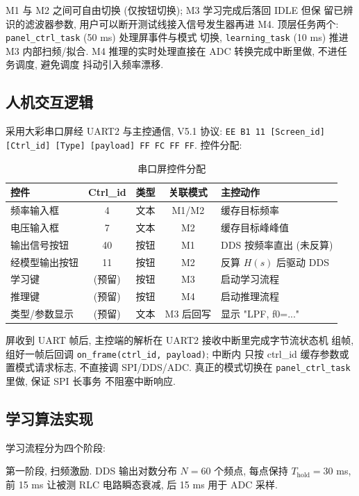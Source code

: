 \documentclass[a4paper]{article}
\begin{document}
M1 与 M2 之间可自由切换 (仅按钮切换); M3 学习完成后落回 IDLE 但保
留已辨识的滤波器参数, 用户可以断开测试线接入信号发生器再进 M4.
顶层任务两个: \texttt{panel\_ctrl\_task} (50 ms) 处理屏事件与模式
切换, \texttt{learning\_task} (10 ms) 推进 M3 内部扫频/拟合. M4
推理的实时处理直接在 ADC 转换完成中断里做, 不进任务调度, 避免调度
抖动引入频率漂移.


\subsection{人机交互逻辑}

采用大彩串口屏经 UART2 与主控通信, V5.1 协议:
\texttt{EE B1 11 [Screen\_id] [Ctrl\_id] [Type] [payload] FF FC FF FF}.
控件分配:

\begin{table}[H]
\centering
\caption{串口屏控件分配}
\begin{tabular}{lclcl}
\toprule
控件            & Ctrl\_id & 类型 & 关联模式 & 主控动作 \\
\midrule
频率输入框      & 4  & 文本 & M1/M2 & 缓存目标频率 \\
电压输入框      & 7  & 文本 & M2    & 缓存目标峰峰值 \\
输出信号按钮    & 40 & 按钮 & M1    & DDS 按频率直出 (未反算) \\
经模型输出按钮  & 11 & 按钮 & M2    & 反算 $H(s)$ 后驱动 DDS \\
学习键          & (预留) & 按钮 & M3 & 启动学习流程 \\
推理键          & (预留) & 按钮 & M4 & 启动推理流程 \\
类型/参数显示   & (预留) & 文本 & M3 后回写 & 显示 "LPF, f0=..." \\
\bottomrule
\end{tabular}
\end{table}

屏收到 UART 帧后, 主控端的解析在 UART2 接收中断里完成字节流状态机
组帧, 组好一帧后回调 \texttt{on\_frame(ctrl\_id, payload)}; 中断内
只按 ctrl\_id 缓存参数或置模式请求标志, 不直接调 SPI/DDS/ADC.
真正的模式切换在 \texttt{panel\_ctrl\_task} 里做, 保证 SPI 长事务
不阻塞中断响应.


\subsection{学习算法实现}

学习流程分为四个阶段:

第一阶段, 扫频激励. DDS 输出对数分布 $N = 60$ 个频点, 每点保持
$T_{\mathrm{hold}} = 30$ ms, 前 15 ms 让被测 RLC 电路瞬态衰减,
后 15 ms 用于 ADC 采样.
\end{document}
